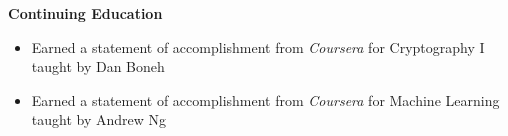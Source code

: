 \documentclass[line,margin]{res}
\begin{document}
\begin{resume}
    \textbf{Continuing Education}
    \begin{itemize} \itemsep -2pt
        \item Earned a statement of accomplishment from \textit{Coursera} for
            Cryptography I taught by Dan Boneh
        \item Earned a statement of accomplishment from \textit{Coursera} for
            Machine Learning taught by Andrew Ng
    \end{itemize}


\end{resume}
\end{document}
